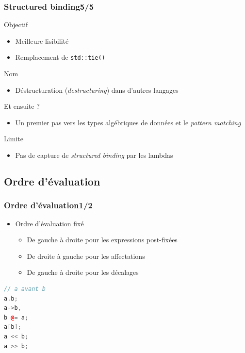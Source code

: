 \documentclass[C++.tex]{subfiles}
\begin{document}
\begin{frame}[fragile]
	\frametitle{Structured binding\titlehfill{}5/5}
	\begin{block}{Objectif}
		\begin{itemize}
			\item Meilleure lisibilité
			\item Remplacement de \lstinline|std::tie()|
		\end{itemize}
	\end{block}

	\begin{block}{Nom}
		\begin{itemize}
			\item Déstructuration (\textit{destructuring}) dans d'autres langages
		\end{itemize}
	\end{block}

	\begin{block}{Et ensuite ?}
		\begin{itemize}
			\item Un premier pas vers les types algébriques de données et le \textit{pattern matching}
		\end{itemize}
	\end{block}


	\begin{alertblock}{Limite}
		\begin{itemize}
			\item Pas de capture de \textit{structured binding} par les lambdas
		\end{itemize}
	\end{alertblock}


\end{frame}

\subsection*{Ordre d'évaluation}
\begin{frame}[fragile]
	\frametitle{Ordre d'évaluation\titlehfill{}1/2}
	\begin{itemize}
		\item Ordre d'évaluation fixé
		\begin{itemize}
			\item De gauche à droite pour les expressions post-fixées
			\item De droite à gauche pour les affectations
			\item De gauche à droite pour les décalages
		\end{itemize}
	\end{itemize}

	\begin{lstlisting}[language=C++]
// a avant b
a.b;
a->b,
b @= a;
a[b];
a << b;
a >> b;\end{lstlisting}
\end{frame}
\end{document}
